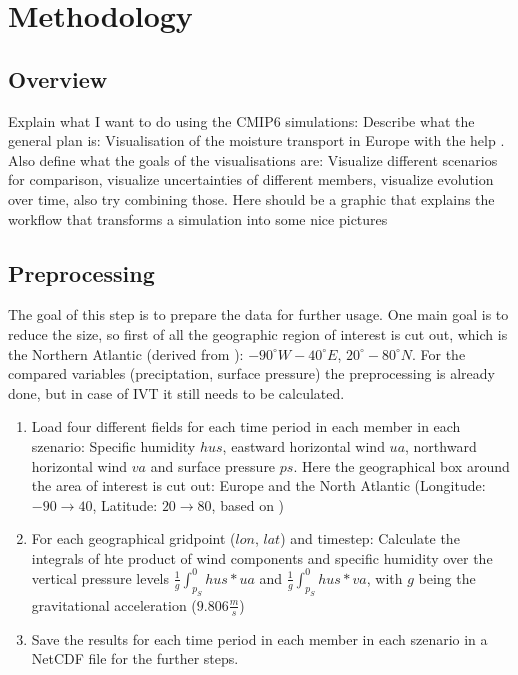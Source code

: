 \chapter{Methodology}
\label{ch:methodology}

\section{Overview}

Explain what I want to do using the CMIP6 simulations: Describe what the general plan is: Visualisation of the moisture transport in Europe with the help . 
Also define what the goals of the visualisations are: Visualize different scenarios for comparison, visualize uncertainties of different members, visualize evolution over time, also try combining those. 
Here should be a graphic that explains the workflow that transforms a simulation into some nice pictures


\section{Preprocessing}

The goal of this step is to prepare the data for further usage. 
One main goal is to reduce the size, so first of all the geographic region of interest is cut out, which is the Northern Atlantic (derived from \cite{vietinghoff_visual_2021}): $-90^\circ W - 40^\circ E$, $20^\circ - 80^\circ N$. 
For the compared variables (preciptation, surface pressure) the preprocessing is already done, but in case of IVT it still needs to be calculated. 


\begin{enumerate}
  \item Load four different fields for each time period in each member in each szenario: Specific humidity $hus$, eastward horizontal wind $ua$, northward horizontal wind $va$ and surface pressure $ps$. Here the geographical box around the area of interest is cut out: Europe and the North Atlantic (Longitude: $-90 \to 40$, Latitude: $20 \to 80$, based on \cite{vietinghoff_visual_2021})
  \item For each geographical gridpoint ($lon$, $lat$) and timestep: Calculate the integrals of hte product of wind components and specific humidity over the vertical pressure levels $\frac{1}{g}\int_{p_S}^0 hus * ua$ and  $\frac{1}{g}\int_{p_S}^0 hus * va$, with $g$ being the gravitational acceleration ($9.806 \frac{m}{s}$) 
  \item Save the results for each time period in each member in each szenario in a NetCDF file for the further steps. 
\end{enumerate}

